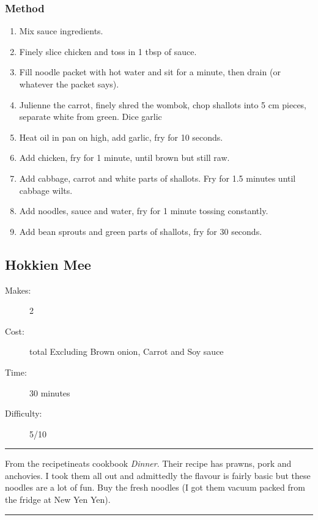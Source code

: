 \documentclass[]{article}
\begin{document}
\subsubsection*{\Large Method}
\begin{enumerate}[font=\huge\color{accent}]
	\item Mix sauce ingredients.
	\item Finely slice chicken and toss in 1 tbsp of sauce.
	\item Fill noodle packet with hot water and sit for a minute, then drain (or whatever the packet says).
	\item Julienne the carrot, finely shred the wombok, chop shallots into 5 cm pieces, separate white from green. Dice garlic
	\item Heat oil in pan on high, add garlic, fry for 10 seconds.
	\item Add chicken, fry for 1 minute, until brown but still raw.
	\item Add cabbage, carrot and white parts of shallots. Fry for 1.5 minutes until cabbage wilts.
	\item Add noodles, sauce and water, fry for 1 minute tossing constantly.
	\item Add bean sprouts and green parts of shallots, fry for 30 seconds.
\end{enumerate}
\newpage
{}\label{rec:Hokkien Mee}
\subsection*{\center\huge Hokkien Mee}
\begin{description}
\item[Makes:] 2 
\item[Cost:]  total Excluding Brown onion, Carrot and Soy sauce
\item[Time:] 30 minutes
\item[Difficulty:] 5/10
\end{description}
\vspace{0.2cm}\hrule\vspace{0.5cm}
\begin{adjustwidth}{0.5 cm}{0.5 cm}

From the recipetineats cookbook \textit{Dinner}. Their recipe has prawns, pork and anchovies. I took them all out and admittedly the flavour is fairly basic but these noodles are a lot of fun. Buy the fresh noodles (I got them vacuum packed from the fridge at New Yen Yen). \hfill{}\color{black}

\end{adjustwidth}
\vspace{0.5cm}\hrule
\end{document}
